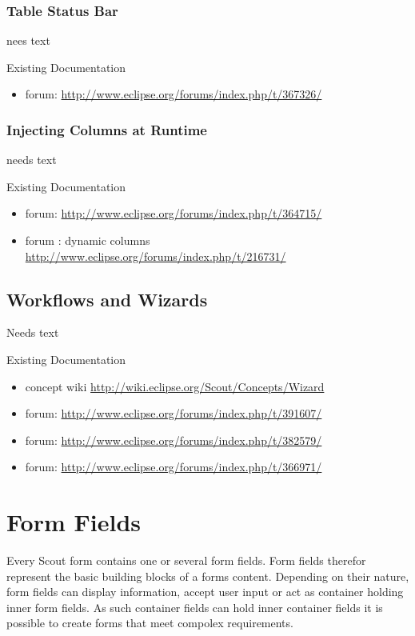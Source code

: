 \documentclass[a4paper,10pt,twoside]{book}
\begin{document}
\subsection{Table Status Bar}
nees text

\noindent Existing Documentation
\begin{itemize}
  \item forum: \url{http://www.eclipse.org/forums/index.php/t/367326/}
\end{itemize}

\subsection{Injecting Columns at Runtime}
needs text

\noindent Existing Documentation
\begin{itemize}
  \item forum: \url{http://www.eclipse.org/forums/index.php/t/364715/}
  \item forum : dynamic columns \url{http://www.eclipse.org/forums/index.php/t/216731/}
\end{itemize}

\section{Workflows and Wizards}
Needs text

\noindent Existing Documentation
\begin{itemize}
  \item concept wiki \url{http://wiki.eclipse.org/Scout/Concepts/Wizard}
  \item forum: \url{http://www.eclipse.org/forums/index.php/t/391607/}
  \item forum: \url{http://www.eclipse.org/forums/index.php/t/382579/}
  \item forum: \url{http://www.eclipse.org/forums/index.php/t/366971/}
\end{itemize}


\chapter{Form Fields}

Every Scout form contains one or several form fields.
Form fields therefor represent the basic building blocks of a forms content. 
Depending on their nature, form fields can display information, accept user input or act as container holding inner form fields.
As such container fields can hold inner container fields it is possible to create forms that meet compolex requirements.
\end{document}
